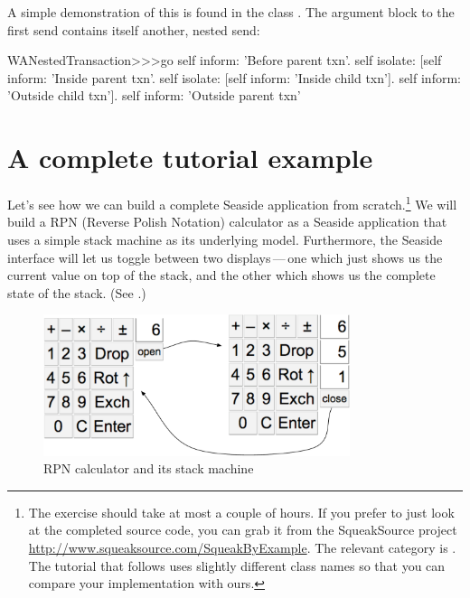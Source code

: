 \documentclass[a4paper,10pt,twoside]{book}
\begin{document}
A simple demonstration of this is found in the class .
The argument block to the first  send contains itself another, nested  send:

\begin{code}{}
WANestedTransaction>>>go
	self inform: 'Before parent txn'.
	self isolate:
			[self inform: 'Inside parent txn'.
			self isolate: [self inform: 'Inside child txn'].
			self inform: 'Outside child txn'].
	self inform: 'Outside parent txn'
\end{code}


\section{A complete tutorial example}


Let's see how we can build a complete Seaside application from scratch.\footnote{The exercise should take at most a couple of hours. If you prefer to just look at the completed source code, you can grab it from the SqueakSource project \url{http://www.squeaksource.com/SqueakByExample}.
The relevant category is . The tutorial that follows uses slightly different class names so that you can compare your implementation with ours.}
We will build a RPN (Reverse Polish Notation) calculator as a Seaside application that uses a simple stack machine as its underlying model.
Furthermore, the Seaside interface will let us toggle between two displays\,---\,one which just shows us the current value on top of the stack, and the other which shows us the complete state of the stack.
(See .)

\begin{figure}[ht]
\begin{center}
\includegraphics[width=0.8\textwidth]{stackMachine}
\caption{RPN calculator and its stack machine}
\label{fig:stackMachine}
\end{center}
\end{figure}
\end{document}
